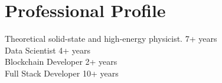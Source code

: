 \documentclass[11pt]{article}
\begin{document}





	
\section*{Professional Profile}
Theoretical solid-state and high-energy physicist. \hfill 7+ years \\[1mm]
Data Scientist \hfill 4+ years \\[1mm]
Blockchain Developer \hfill 2+ years \\[1mm]
Full Stack Developer \hfill 10+ years \\[1mm]
\end{document}
